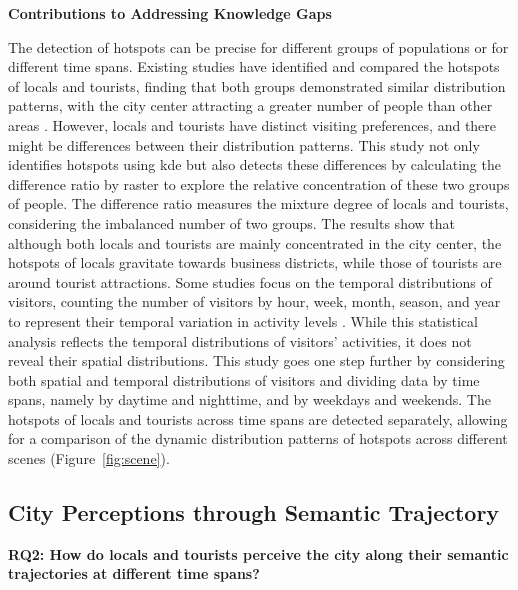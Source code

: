 \documentclass{article}
\theoremstyle{remark}
\begin{document}
\textbf{Contributions to Addressing Knowledge Gaps}

The detection of hotspots can be precise for different groups of populations or for different time spans. Existing studies have identified and compared the hotspots of locals and tourists, finding that both groups demonstrated similar distribution patterns, with the city center attracting a greater number of people than other areas \citep{garcia-palomares_identification_2015,su_analysing_2020}. However, locals and tourists have distinct visiting preferences, and there might be differences between their distribution patterns. This study not only identifies hotspots using \acrshort{kde} but also detects these differences by calculating the difference ratio by raster to explore the relative concentration of these two groups of people. The difference ratio measures the mixture degree of locals and tourists, considering the imbalanced number of two groups. The results show that although both locals and tourists are mainly concentrated in the city center, the hotspots of locals gravitate towards business districts, while those of tourists are around tourist attractions. Some studies focus on the temporal distributions of visitors, counting the number of visitors by hour, week, month, season, and year to represent their temporal variation in activity levels \citep{li_photography-based_2011,su_analysing_2020}. While this statistical analysis reflects the temporal distributions of visitors' activities, it does not reveal their spatial distributions. This study goes one step further by considering both spatial and temporal distributions of visitors and dividing data by time spans, namely by daytime and nighttime, and by weekdays and weekends. The hotspots of locals and tourists across time spans are detected separately, allowing for a comparison of the dynamic distribution patterns of hotspots across different scenes (Figure~\ref{fig:scene}).


\subsection{City Perceptions through Semantic Trajectory} \label{discussion_rq2}

\textbf{RQ2: How do locals and tourists perceive the city along their semantic trajectories at different time spans?}
\end{document}
